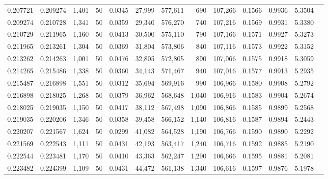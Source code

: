 \begin{tabular}{rrrrrrrrrrrrr}
0.207721 & 0.209274 & 1,401 &  50 &                                     0.0345 &  27,999 & 577,611 &     690 & 107,266 & 0.1566 & 0.9936 & 5.3504 \\
0.209274 & 0.210728 & 1,341 &  50 &                                     0.0359 &  29,340 & 576,270 &     740 & 107,216 & 0.1569 & 0.9931 & 5.3380 \\
0.210729 & 0.211965 & 1,160 &  50 &                                     0.0413 &  30,500 & 575,110 &     790 & 107,166 & 0.1571 & 0.9927 & 5.3273 \\
0.211965 & 0.213261 & 1,304 &  50 &                                     0.0369 &  31,804 & 573,806 &     840 & 107,116 & 0.1573 & 0.9922 & 5.3152 \\
0.213262 & 0.214263 & 1,001 &  50 &                                     0.0476 &  32,805 & 572,805 &     890 & 107,066 & 0.1575 & 0.9918 & 5.3059 \\
0.214265 & 0.215486 & 1,338 &  50 &                                     0.0360 &  34,143 & 571,467 &     940 & 107,016 & 0.1577 & 0.9913 & 5.2935 \\
0.215487 & 0.216898 & 1,551 &  50 &                                     0.0312 &  35,694 & 569,916 &     990 & 106,966 & 0.1580 & 0.9908 & 5.2792 \\
0.216898 & 0.218025 & 1,268 &  50 &                                     0.0379 &  36,962 & 568,648 &   1,040 & 106,916 & 0.1583 & 0.9904 & 5.2674 \\
0.218025 & 0.219035 & 1,150 &  50 &                                     0.0417 &  38,112 & 567,498 &   1,090 & 106,866 & 0.1585 & 0.9899 & 5.2568 \\
0.219035 & 0.220206 & 1,346 &  50 &                                     0.0358 &  39,458 & 566,152 &   1,140 & 106,816 & 0.1587 & 0.9894 & 5.2443 \\
0.220207 & 0.221567 & 1,624 &  50 &                                     0.0299 &  41,082 & 564,528 &   1,190 & 106,766 & 0.1590 & 0.9890 & 5.2292 \\
0.221569 & 0.222543 & 1,111 &  50 &                                     0.0431 &  42,193 & 563,417 &   1,240 & 106,716 & 0.1592 & 0.9885 & 5.2190 \\
0.222544 & 0.223481 & 1,170 &  50 &                                     0.0410 &  43,363 & 562,247 &   1,290 & 106,666 & 0.1595 & 0.9881 & 5.2081 \\
0.223482 & 0.224399 & 1,109 &  50 &                                     0.0431 &  44,472 & 561,138 &   1,340 & 106,616 & 0.1597 & 0.9876 & 5.1978 \\

\end{tabular}
